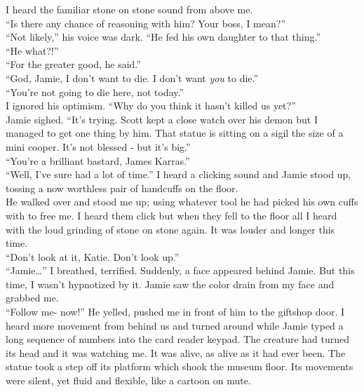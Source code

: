 \documentclass[a5paper]{scrartcl}
\begin{document}
I heard the familiar stone on stone sound from above me. \\


\enquote{Is there any chance of reasoning with him? Your boss, I mean?}\\


\enquote{Not likely,} his voice was dark. \enquote{He fed his own daughter to that thing.}\\


\enquote{He what?!}\\


\enquote{For the greater good, he said.}\\


\enquote{God, Jamie, I don't want to die. I don't want \textit{you} to die.}\\


\enquote{You're not going to die here, not today.}\\


I ignored his optimism. \enquote{Why do you think it hasn't killed us yet?}\\


Jamie sighed. \enquote{It's trying. Scott kept a close watch over his demon but I managed to get one thing by him. That statue is sitting on a sigil the size of a mini cooper. It's not blessed - but it's big.}\\


\enquote{You're a brilliant bastard, James Karras.}\\


\enquote{Well, I've sure had a lot of time.} I heard a clicking sound and Jamie stood up, tossing a now worthless pair of handcuffs on the floor.\\


He walked over and stood me up; using whatever tool he had picked his own cuffs with to free me. I heard them click but when they fell to the floor all I heard with the loud grinding of stone on stone again. It was louder and longer this time.\\


\enquote{Don't look at it, Katie. Don't look up.}\\


\enquote{Jamie\dots } I breathed, terrified. Suddenly, a face appeared behind Jamie. But this time, I wasn't hypnotized by it. Jamie saw the color drain from my face and grabbed me.\\


\enquote{Follow me- now!} He yelled, pushed me in front of him to the giftshop door. I heard more movement from behind us and turned around while Jamie typed a long sequence of numbers into the card reader keypad. The creature had turned its head and it was watching me. It was alive, as alive as it had ever been. The statue took a step off its platform which shook the museum floor. Its movements were silent, yet fluid and flexible, like a cartoon on mute.\\
\end{document}
